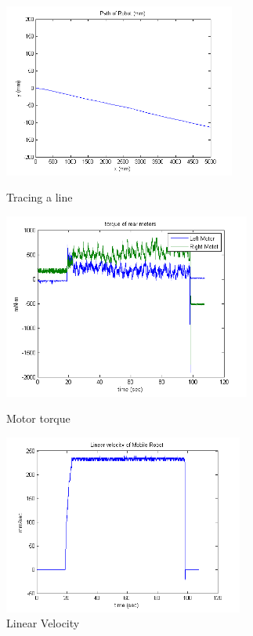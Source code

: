 \begin{figure}
	\begin{minipage}[t]{0.5\textwidth}
		\centering
		\includegraphics[width=3.0in]{Chapter5/fig/Line} 
		\caption{Tracing a line}\label{fig:line}
	\end{minipage}
	\hfill
	\begin{minipage}[t]{0.5\textwidth}
		\centering
		\includegraphics[width=3.2in]{Chapter5/fig/linTorq} 
		\caption{Motor torque}\label{fig:linTorq}
	\end{minipage}
	\begin{minipage}[t]{0.5\textwidth}
		\centering
		\includegraphics[width=3.1in]{Chapter5/fig/linVel} 
		\caption{Linear Velocity}\label{fig:linVel}
	\end{minipage}
	\hfill
	\begin{minipage}[t]{0.5\textwidth}

\end{minipage}
\end{figure}
